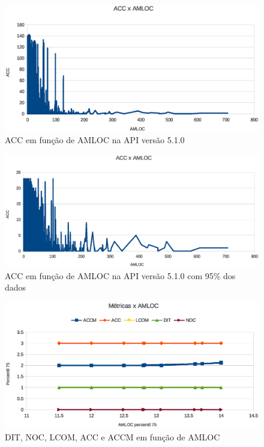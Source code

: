 \begin{figure}[!htb]
\centering
\includegraphics [keepaspectratio=true,scale=0.7]{figuras/accxamloc510.eps}
\caption{ACC em função de AMLOC na API versão 5.1.0}
\label{fig:accxamloc510}
\end{figure}


\begin{figure}[!htb]
\centering
\includegraphics [keepaspectratio=true,scale=0.7]{figuras/accxamloc51095.eps}
\caption{ACC em função de AMLOC na API versão 5.1.0 com 95\% dos dados}
\label{fig:accxamloc51095}
\end{figure}

\begin{figure}[!htb]
\centering
\includegraphics [keepaspectratio=true,scale=0.7]{figuras/metricasxamloc.eps}
\caption{DIT, NOC, LCOM, ACC e ACCM em função de AMLOC}
\label{fig:metricasxamloc}
\end{figure}


